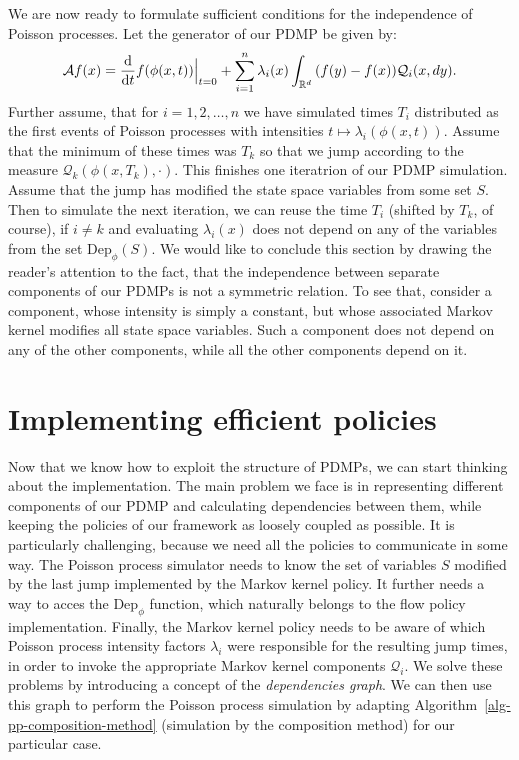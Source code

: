 \documentclass[report.tex]{subfiles}
\begin{document}
We are now ready to formulate sufficient conditions
for the independence of Poisson processes. Let the generator of our PDMP be given
by:
\begin{equation}
  \label{pdmp-generator-n-components}
  \mathcal{A}f(x) =
  \dv{}{t}f(\phi(x, t)) \Bigr|_{t = 0} +
  \sum_{i=1}^{n} \lambda_{i}(x)\int_{{\mathbb{R}^{d}}}^{{}} {}{(f(y) - f(x))\mathcal{Q}_{i}(x, dy)}.
\end{equation}
Further assume, that for $i = 1, 2, \dots, n$
we have simulated times $T_{i}$ distributed as the first events of Poisson processes
with intensities $t \mapsto \lambda_{i}(\phi(x, t))$.
Assume that the minimum of these times was $T_{k}$ so that we jump according
to the measure $\mathcal{Q}_{k}(\phi(x, T_{k}), \cdot)$.
This finishes one iteratrion of our PDMP simulation.
Assume that the jump has modified the state space variables from some set
$S$. Then to simulate the next iteration, we can reuse the time $T_{i}$ (shifted by $T_{k}$, of course),
if $i \neq k$ and evaluating $\lambda_{i}(x)$ does not depend on any of the variables from the
set $\text{Dep}_{\phi}(S)$. We would like to conclude this section by drawing the
reader's attention to the fact, that the independence between separate components
of our PDMPs is not a symmetric relation. To see that, consider a component, whose
intensity is simply a constant, but whose associated Markov kernel modifies all
state space variables. Such a component does not depend on any of the other components,
while all the other components depend on it.


\section{Implementing efficient policies}
\label{efficient-policies-implementation}

Now that we know how to exploit the structure of PDMPs, we can start thinking about
the implementation.
The main problem we face is in representing different components of our PDMP
and calculating dependencies between them, while keeping the policies of our
framework as loosely coupled as possible.
It is particularly challenging, because we need all the policies to communicate in some way.
The Poisson process simulator needs to know the set of variables $S$ modified by
the last jump implemented by the Markov kernel policy.
It further needs a way to acces the $\text{Dep}_{\phi}$ function, which naturally
belongs to the flow policy implementation.
Finally, the Markov kernel policy needs to be aware of which Poisson process
intensity factors $\lambda_{i}$ were responsible for the resulting jump times, in order to invoke
the appropriate Markov kernel components $\mathcal{Q}_{i}$.
We solve these problems by introducing a concept of the \textit{dependencies graph}.
We can then use this graph to perform the Poisson process simulation by
adapting Algorithm~\ref{alg-pp-composition-method} (simulation by the composition method)
for our particular case.
\end{document}
